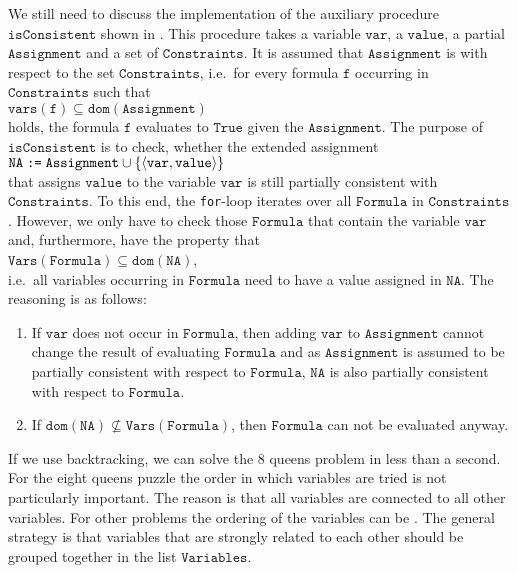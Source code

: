 We still need to discuss the implementation of the auxiliary procedure $\texttt{isConsistent}$
shown in .  This procedure takes a variable $\texttt{var}$, a $\texttt{value}$, a partial 
$\texttt{Assignment}$ and a set of $\texttt{Constraints}$.  It is assumed that $\texttt{Assignment}$ is
 with respect to the set $\texttt{Constraints}$, i.e.~for every formula $\texttt{f}$
occurring in $\texttt{Constraints}$ such that
\\[0.2cm]
\hspace*{1.3cm}
$\texttt{vars}(\texttt{f}) \subseteq \texttt{dom}(\texttt{Assignment})$
\\[0.2cm]
holds, the formula $\texttt{f}$ evaluates to $\texttt{True}$ given the $\texttt{Assignment}$.  The purpose of
$\texttt{isConsistent}$ is to check, whether the extended assignment
\\[0.2cm]
\hspace*{1.3cm}
$\texttt{NA} \;\texttt{:=}\;\texttt{Assignment} \cup \{ \pair(\texttt{var}, \texttt{value}) \}$
\\[0.2cm]
that assigns $\texttt{value}$ to the variable $\texttt{var}$ is still partially consistent with $\texttt{Constraints}$. 
To this end, the \texttt{for}-loop iterates over all $\texttt{Formula}$ in $\texttt{Constraints}$. 
However, we only have to check those $\texttt{Formula}$ that contain the variable $\texttt{var}$ and,
furthermore, have the property that
\\[0.2cm]
\hspace*{1.3cm}
$\texttt{Vars}(\texttt{Formula}) \subseteq \texttt{dom}(\texttt{NA})$,
\\[0.2cm]
i.e.~all variables occurring in $\texttt{Formula}$ need to have a value assigned in
$\texttt{NA}$.  The reasoning is as follows:
\begin{enumerate}
\item If $\texttt{var}$ does not occur in $\texttt{Formula}$, then adding $\texttt{var}$ to
      $\texttt{Assignment}$ cannot change the result of evaluating $\texttt{Formula}$ and as
      $\texttt{Assignment}$ is assumed to be partially consistent with respect to $\texttt{Formula}$, 
      $\texttt{NA}$ is also partially consistent with respect to $\texttt{Formula}$.
\item If $\texttt{dom}(\texttt{NA}) \not\subseteq \texttt{Vars}(\texttt{Formula})$, then $\texttt{Formula}$ can not be evaluated anyway. 
\end{enumerate}
If we use backtracking, we can solve the 8 queens problem in less than a second.
For the eight queens puzzle the order in which variables are tried is not particularly important.  The reason
is that all variables are connected to all other variables.  For other problems the ordering of the variables
can be .  The general strategy is that variables that are strongly related to each other should
be grouped together in the list $\texttt{Variables}$.



